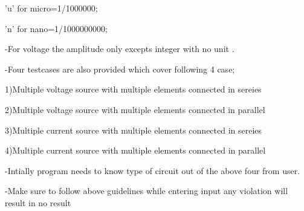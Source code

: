 \documentclass[]{article}
\begin{document}
'u' for micro=1/1000000;

'n' for nano=1/1000000000;


-For voltage the amplitude only excepts integer with no unit .

-Four testcases are also provided which cover following 4 case;

1)Multiple voltage source with multiple elements connected in sereies

2)Multiple voltage source with multiple elements connected in parallel

3)Multiple current source with multiple elements connected in sereies

4)Multiple current source with multiple elements connected in parallel

-Intially program needs to know  type of circuit out of the above four from user.

-Make sure to follow above guidelines while entering input any violation will result in no result  




	
\end{document}
